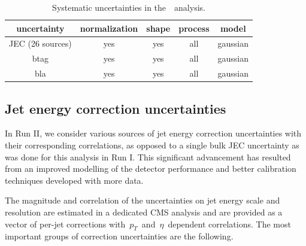 \begin{table}[h!]

\begin{center}
\caption{Systematic uncertainties in the~\ttHbb~analysis.}
\label{tab:systematic_uncertainties}
\begin{tabular}{c|cccc}
\hline
uncertainty & normalization & shape & process & model \\
\hline
JEC (26 sources) & yes & yes & all & gaussian \\
btag & yes & yes & all & gaussian \\
\hline
bla & yes & yes & all & gaussian \\
\hline
\hline
\end{tabular}
\end{center}
\end{table}

\subsection{Jet energy correction uncertainties}
\label{sec:jec_unc}
In Run II, we consider various sources of jet energy correction uncertainties with their corresponding correlations, as opposed to a single bulk JEC uncertainty as was done for this analysis in Run I. This significant advancement has resulted from an improved modelling of the detector performance and better calibration techniques developed with more data. 

The magnitude and correlation of the uncertainties on jet energy scale and resolution are estimated in a dedicated CMS analysis and are provided as a vector of per-jet corrections with~$p_T$~and~$\eta$~dependent correlations. The most important groups of correction uncertainties are the following.

